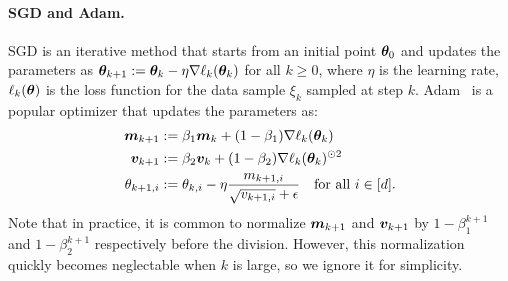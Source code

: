 \paragraph{SGD and Adam.} 
SGD is an iterative method that starts from an initial point ${\bm{\theta}}_0$ and updates the parameters as
${\bm{\theta}}_{k+1} := {\bm{\theta}}_{k} - \eta \nabla \ell_{k}({\bm{\theta}}_{k})$ for all $k \ge 0$,
where $\eta$ is the learning rate, $\ell_k({\bm{\theta}})$ is the loss function for the data sample $\xi_k$ sampled at step $k$.
Adam~\citep{kingma2014adam} is a popular optimizer that updates the parameters as:
\begin{align*}
    {\bm{m}}_{k+1} &:= \beta_1 {\bm{m}}_k + (1-\beta_1) \nabla \ell_{k}({\bm{\theta}}_{k}) \\
    {\bm{v}}_{k+1} &:= \beta_2 {\bm{v}}_k + (1-\beta_2) \nabla\ell_{k}({\bm{\theta}}_{k})^{\odot 2} \\
    \theta_{k+1,i} &:= \theta_{k,i} - \eta \frac{m_{k+1,i}}{\sqrt{v_{k+1,i}}+\epsilon} \quad \text{for all } i \in [d].
\end{align*}
Note that in practice, it is common to normalize ${\bm{m}}_{k+1}$ and ${\bm{v}}_{k+1}$ by $1-\beta_1^{k+1}$ and $1-\beta_2^{k+1}$ respectively before the division. However, this normalization quickly becomes neglectable when $k$ is large, so we ignore it for simplicity.

